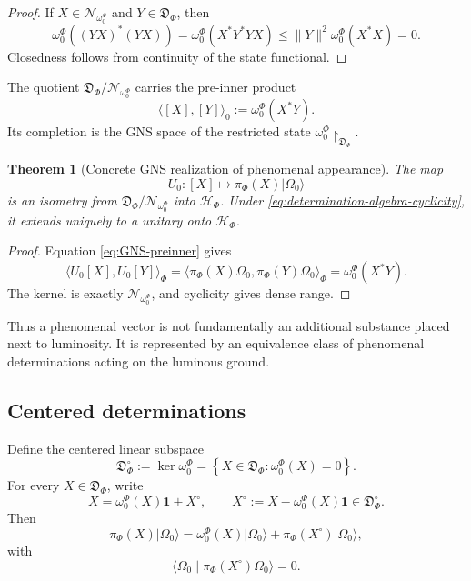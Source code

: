 \documentclass[11pt,reqno]{scrartcl}
\newcommand{\scrHF}{\mathscr H_{\Phi}}
\newcommand{\piF}{\pi_{\Phi}}
\newcommand{\omegaF}{\omega_{0}^{\Phi}}
\newcommand{\idop}{\mathbf 1}
\newcommand{\ket}[1]{\lvert #1\rangle}
\newcommand{\braket}[2]{\langle #1\mid #2\rangle}
\newcommand{\inner}[2]{\langle #1,#2\rangle}
\newcommand{\restr}[2]{#1\!\upharpoonright_{#2}}
\newcommand{\detAlg}{\mathfrak D_{\Phi}}
\newcommand{\nullIdeal}{\mathcal N_{\omega_{0}^{\Phi}}}
\newcommand{\centDet}{\mathfrak D_{\Phi}^{\circ}}
\theoremstyle{plain}
\newtheorem{theorem}{Theorem}[section]
\theoremstyle{definition}
\theoremstyle{remark}
\begin{document}
\begin{proof}
If $X\in\nullIdeal$ and $Y\in\detAlg$, then
\begin{equation}
  \omegaF((YX)^*(YX))
  =\omegaF(X^*Y^*YX)
  \leq\|Y\|^2\omegaF(X^*X)
  =0.
\end{equation}
Closedness follows from continuity of the state functional.
\end{proof}

The quotient $\detAlg/\nullIdeal$ carries the pre-inner product
\begin{equation}
  \inner{[X]}{[Y]}_0
  :=\omegaF(X^*Y).
  \label{eq:GNS-preinner}
\end{equation}
Its completion is the GNS space of the restricted state
$\omegaF\restr{}{\detAlg}$.

\begin{theorem}[Concrete GNS realization of phenomenal appearance]
\label{thm:concrete-GNS-appearance}
The map
\begin{equation}
  U_0:[X]\longmapsto\piF(X)\ket{\Omega_0}
  \label{eq:GNS-concrete-map}
\end{equation}
is an isometry from $\detAlg/\nullIdeal$ into $\scrHF$.  Under
\cref{eq:determination-algebra-cyclicity}, it extends uniquely to a unitary
onto $\scrHF$.
\end{theorem}

\begin{proof}
Equation \eqref{eq:GNS-preinner} gives
\begin{equation}
  \inner{U_0[X]}{U_0[Y]}_{\Phi}
  =\inner{\piF(X)\Omega_0}{\piF(Y)\Omega_0}_{\Phi}
  =\omegaF(X^*Y).
\end{equation}
The kernel is exactly $\nullIdeal$, and cyclicity gives dense range.
\end{proof}

Thus a phenomenal vector is not fundamentally an additional substance placed
next to luminosity.  It is represented by an equivalence class of
phenomenal determinations acting on the luminous ground.

\subsection{Centered determinations}

Define the centered linear subspace
\begin{equation}
  \boxed{
  \centDet
  :=\ker\omegaF
  =\left\{
      X\in\detAlg:\omegaF(X)=0
    \right\}.}
  \label{eq:centered-determination-space}
\end{equation}
For every $X\in\detAlg$, write
\begin{equation}
  X=\omegaF(X)\idop+X^{\circ},
  \qquad
  X^{\circ}:=X-\omegaF(X)\idop\in\centDet.
  \label{eq:centered-determination-decomposition}
\end{equation}
Then
\begin{equation}
  \piF(X)\ket{\Omega_0}
  =\omegaF(X)\ket{\Omega_0}
  +\piF(X^{\circ})\ket{\Omega_0},
  \label{eq:ground-content-vector-decomposition}
\end{equation}
with
\begin{equation}
  \braket{\Omega_0}{\piF(X^{\circ})\Omega_0}=0.
  \label{eq:centered-vector-orthogonality}
\end{equation}
\end{document}
